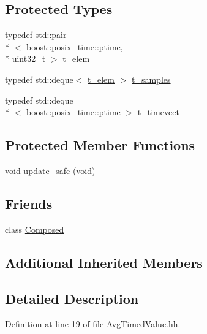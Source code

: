 \subsection*{Protected Types}
\begin{DoxyCompactItemize}
\item 
typedef std\-::pair\\*
$<$ boost\-::posix\-\_\-time\-::ptime, \\*
uint32\-\_\-t $>$ \hyperlink{classxtd_1_1counters_1_1AvgTimedValue_a1495aff37899fa6b011aed1b4283db18}{t\-\_\-elem}
\item 
typedef std\-::deque$<$ \hyperlink{classxtd_1_1counters_1_1AvgTimedValue_a1495aff37899fa6b011aed1b4283db18}{t\-\_\-elem} $>$ \hyperlink{classxtd_1_1counters_1_1AvgTimedValue_a71d5e67cb282762c880dc4986e5a8d7c}{t\-\_\-samples}
\item 
typedef std\-::deque\\*
$<$ boost\-::posix\-\_\-time\-::ptime $>$ \hyperlink{classxtd_1_1counters_1_1AvgTimedValue_a901afa3b937939c2132a593d4a801cad}{t\-\_\-timevect}
\end{DoxyCompactItemize}
\subsection*{Protected Member Functions}
\begin{DoxyCompactItemize}
\item 
void \hyperlink{classxtd_1_1counters_1_1AvgTimedValue_a1430fd5ff91e960a251b0656c2b5c0ca}{update\-\_\-safe} (void)
\end{DoxyCompactItemize}
\subsection*{Friends}
\begin{DoxyCompactItemize}
\item 
class \hyperlink{classxtd_1_1counters_1_1AvgTimedValue_a93e934ad70d5b32b14beed5572450abf}{Composed}
\end{DoxyCompactItemize}
\subsection*{Additional Inherited Members}


\subsection{Detailed Description}


Definition at line 19 of file Avg\-Timed\-Value.\-hh.



